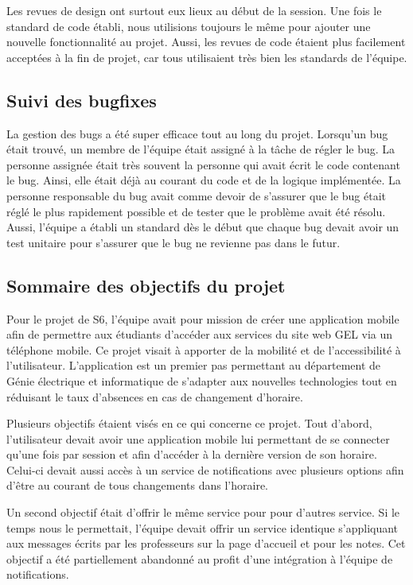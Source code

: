     Les revues de design ont surtout eux lieux au début de la session. Une fois le standard de code établi, nous utilisions toujours le même pour ajouter une nouvelle fonctionnalité au projet. Aussi, les revues de code étaient plus facilement acceptées à la fin de projet, car tous utilisaient très bien les standards de l'équipe.

    \subsection{Suivi des bugfixes}
    La gestion des bugs a été super efficace tout au long du projet. Lorsqu'un bug était trouvé, un membre de l'équipe était assigné à la tâche de régler le bug. La personne assignée était très souvent la personne qui avait écrit le code contenant le bug. Ainsi, elle était déjà au courant du code et de la logique implémentée. La personne responsable du bug avait comme devoir de s'assurer que le bug était réglé le plus rapidement possible et de tester que le problème avait été résolu. Aussi, l'équipe a établi un standard dès le début que chaque bug devait avoir un test unitaire pour s'assurer que le bug ne revienne pas dans le futur.

    \subsection{Sommaire des objectifs du projet}
    Pour le projet de S6, l'équipe avait pour mission de créer une application mobile afin de permettre aux étudiants d'accéder aux services du site web GEL via un téléphone mobile. Ce projet visait à apporter de la mobilité et de l'accessibilité à l'utilisateur. L'application est un premier pas permettant au département de Génie électrique et informatique de s'adapter aux nouvelles technologies tout en réduisant le taux d'absences en cas de changement d'horaire.

    Plusieurs objectifs étaient visés en ce qui concerne ce projet. Tout d'abord, l'utilisateur devait avoir une application mobile lui permettant de se connecter qu'une fois par session et afin d'accéder à la dernière version de son horaire. Celui-ci devait aussi accès à un service de notifications avec plusieurs options afin d'être au courant de tous changements dans l'horaire.

    Un second objectif était d'offrir le même service pour pour d'autres service. Si le temps nous le permettait, l'équipe devait offrir un service identique s'appliquant aux messages écrits par les professeurs sur la page d'accueil et pour les notes. Cet objectif a été partiellement abandonné au profit d'une intégration à l'équipe de notifications.

